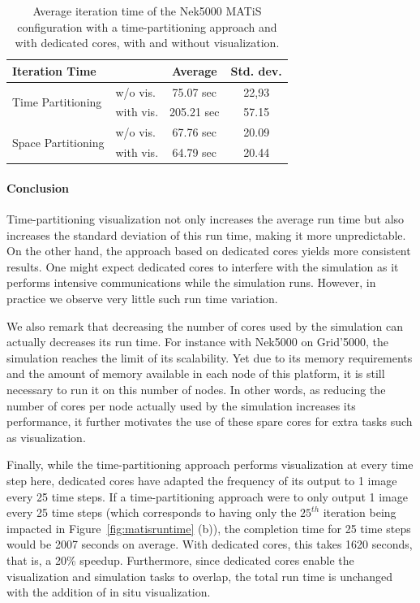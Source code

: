 \begin{table}
	\center
\caption[Average iteration time of Nek5000's MATiS configuration]{Average 
	iteration time of the Nek5000 MATiS configuration with a
   time-partitioning approach and with dedicated cores, with and without 
   visualization.\vspace{0.5cm}}\label{tab:matisstats}
   \begin{tabular}{|l|l|c|c|}
   \hline
\textbf{Iteration Time} & & Average & Std. dev. \\
	\hline
\multirow{2}{*}{Time Partitioning} & w/o vis. & 75.07 sec  & 22,93 \\
	& with vis. & 205.21 sec & 57.15 \\
	\hline
\multirow{2}{*}{Space Partitioning} & w/o vis. & 67.76 sec & 20.09 \\
	& with vis. & 64.79 sec  & 20.44 \\
	\hline
   \end{tabular}
\end{table}

\paragraph{Conclusion} Time-partitioning visualization not only increases the average run time but 
also increases the standard deviation of this run time, making it more unpredictable.
On the other hand, the approach based on dedicated cores yields more consistent results.
One might expect dedicated cores to interfere with the
simulation as it performs intensive communications while the simulation runs. 
However, in practice we observe very little such run time variation.

We also remark that decreasing the number of cores used by the simulation can actually
decreases its run time. For instance with Nek5000 on Grid'5000, the simulation reaches the
limit of its scalability. Yet due to its memory requirements and the amount of memory available
in each node of this platform, it is still necessary to run
it on this number of nodes. In other words, as reducing the number of cores per node
actually used by the simulation increases its performance, it further motivates the
use of these spare cores for extra tasks such as visualization.

Finally, while the time-partitioning approach performs visualization at every 
time step here, dedicated cores have adapted the frequency of 
its output to 1 image every 25 time steps.
If a time-partitioning approach were to only output 1 image every 25 time steps 
(which corresponds to having only the $25^{th}$ iteration being impacted 
in Figure~\ref{fig:matisruntime} (b)), the completion time for 25 time steps 
would be 2007 seconds on average.
With dedicated cores, this takes 1620 seconds, that is, a 20\% speedup. 
Furthermore, since dedicated cores enable the visualization and 
simulation tasks to overlap, the total run time is unchanged with the addition of in situ visualization.
